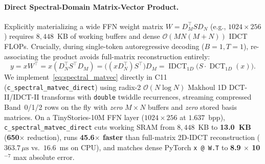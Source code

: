 \documentclass[11pt,a4paper]{article}
\begin{document}
\paragraph{Direct Spectral-Domain Matrix-Vector Product.}
Explicitly materializing a wide FFN weight matrix $W = D_M^\top S D_N$ (e.g., $1024 \times 256$) requires $8{,}448$~KB of working buffers and dense $\mathcal{O}(M N (M+N))$ IDCT FLOPs. Crucially, during single-token autoregressive decoding ($B=1, T=1$), re-associating the product avoids full-matrix reconstruction entirely:
\begin{equation}
    y = x W^\top = x (D_N^\top S^\top D_M) = \big((x D_N^\top) S^\top\big) D_M = \operatorname{IDCT}_{1D}\!\Big(S \cdot \operatorname{DCT}_{1D}(x)\Big).
    \label{eq:spectral_matvec}
\end{equation}
We implement~\eqref{eq:spectral_matvec} directly in C11 (\texttt{c\_spectral\_matvec\_direct}) using radix-2 $\mathcal{O}(N \log N)$ Makhoul 1D DCT-II/IDCT-II transforms with \texttt{double} twiddle recurrences, streaming compressed Band~0/1/2 rows on the fly with \emph{zero} $M \times N$ buffers and \emph{zero} stored basis matrices. On a TinyStories-10M FFN layer ($1024 \times 256$ at $1.637$~bpp), \texttt{c\_spectral\_matvec\_direct} cuts working SRAM from $8{,}448$~KB to \textbf{13.0~KB} (\textbf{650$\times$} reduction), runs \textbf{45.6$\times$ faster} than full-matrix 2D-IDCT reconstruction ($363.7\,\mu\text{s}$ vs.\ $16.6$~ms on CPU), and matches dense PyTorch \texttt{x @ W.T} to \textbf{8.9 $\times$ 10$^{-7}$} max absolute error.
\end{document}
